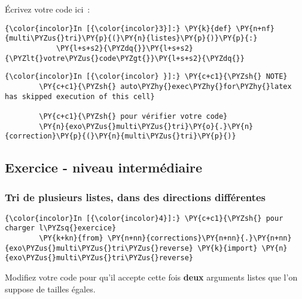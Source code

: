     Écrivez votre code ici~:

    \begin{Verbatim}[commandchars=\\\{\},frame=single,framerule=0.3mm,rulecolor=\color{cellframecolor}]
{\color{incolor}In [{\color{incolor}3}]:} \PY{k}{def} \PY{n+nf}{multi\PYZus{}tri}\PY{p}{(}\PY{n}{listes}\PY{p}{)}\PY{p}{:} 
            \PY{l+s+s2}{\PYZdq{}}\PY{l+s+s2}{\PYZlt{}votre\PYZus{}code\PYZgt{}}\PY{l+s+s2}{\PYZdq{}}
\end{Verbatim}


    \begin{Verbatim}[commandchars=\\\{\},frame=single,framerule=0.3mm,rulecolor=\color{cellframecolor}]
{\color{incolor}In [{\color{incolor} }]:} \PY{c+c1}{\PYZsh{} NOTE}
        \PY{c+c1}{\PYZsh{} auto\PYZhy{}exec\PYZhy{}for\PYZhy{}latex has skipped execution of this cell}
        
        \PY{c+c1}{\PYZsh{} pour vérifier votre code}
        \PY{n}{exo\PYZus{}multi\PYZus{}tri}\PY{o}{.}\PY{n}{correction}\PY{p}{(}\PY{n}{multi\PYZus{}tri}\PY{p}{)}
\end{Verbatim}


    \hypertarget{exercice---niveau-intermuxe9diaire}{%
\subsection{Exercice - niveau
intermédiaire}\label{exercice---niveau-intermuxe9diaire}}

    \hypertarget{tri-de-plusieurs-listes-dans-des-directions-diffuxe9rentes}{%
\subsubsection{Tri de plusieurs listes, dans des directions
différentes}\label{tri-de-plusieurs-listes-dans-des-directions-diffuxe9rentes}}

    \begin{Verbatim}[commandchars=\\\{\},frame=single,framerule=0.3mm,rulecolor=\color{cellframecolor}]
{\color{incolor}In [{\color{incolor}4}]:} \PY{c+c1}{\PYZsh{} pour charger l\PYZsq{}exercice}
        \PY{k+kn}{from} \PY{n+nn}{corrections}\PY{n+nn}{.}\PY{n+nn}{exo\PYZus{}multi\PYZus{}tri\PYZus{}reverse} \PY{k}{import} \PY{n}{exo\PYZus{}multi\PYZus{}tri\PYZus{}reverse}
\end{Verbatim}


    Modifiez votre code pour qu'il accepte cette fois \textbf{deux}
arguments listes que l'on suppose de tailles égales.

